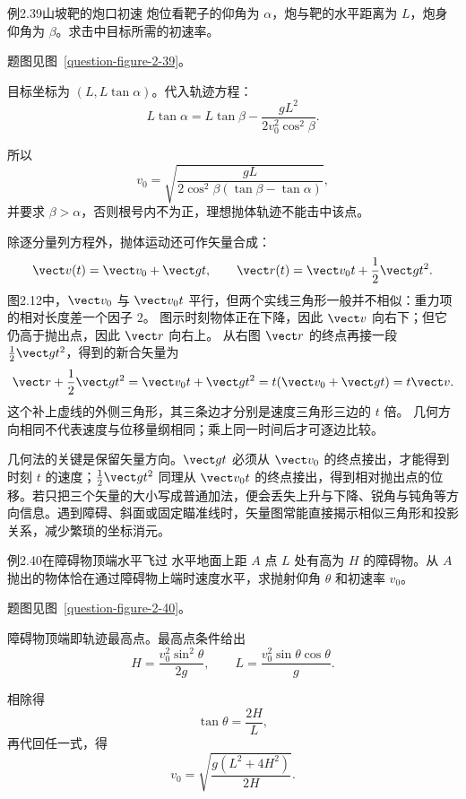 \begin{origexamplebox}{例2.39\quad 山坡靶的炮口初速}
炮位看靶子的仰角为 $\alpha$，炮与靶的水平距离为 $L$，炮身仰角为 $\beta$。求击中目标所需的初速率。
\par 题图见图~\ref{question-figure-2-39}。
\KQuestionBN
\end{origexamplebox}
\begin{xesolution}
目标坐标为 $(L,L\tan\alpha)$。代入轨迹方程：
\[
L\tan\alpha=L\tan\beta-
\frac{gL^2}{2v_0^2\cos^2\beta}.
\]
\HillsideTargetDiagram

所以
\[
 \boxed{v_0=\sqrt{\frac{gL}{2\cos^2\beta(\tan\beta-\tan\alpha)}}},
\]
并要求 $\beta>\alpha$，否则根号内不为正，理想抛体轨迹不能击中该点。
\end{xesolution}

\ProjectileVectorsDiagram

除逐分量列方程外，抛体运动还可作矢量合成：
\begin{equation}
 \vect v(t)=\vect v_0+\vect g t,
 \qquad
 \vect r(t)=\vect v_0t+\frac12\vect g t^2.
\end{equation}
图2.12中，$\vect v_0$ 与 $\vect v_0t$ 平行，但两个实线三角形一般并不相似：重力项的相对长度差一个因子 $2$。
图示时刻物体正在下降，因此 $\vect v$ 向右下；但它仍高于抛出点，因此 $\vect r$ 向右上。
从右图 $\vect r$ 的终点再接一段 $\frac12\vect g t^2$，得到的新合矢量为
\[
 \vect r+\frac12\vect g t^2
 =\vect v_0t+\vect g t^2=t(\vect v_0+\vect gt)=t\vect v.
\]
这个补上虚线的外侧三角形，其三条边才分别是速度三角形三边的 $t$ 倍。
几何方向相同不代表速度与位移量纲相同；乘上同一时间后才可逐边比较。

几何法的关键是保留矢量方向。$\vect g t$ 必须从 $\vect v_0$ 的终点接出，才能得到时刻 $t$ 的速度；$\frac12\vect g t^2$ 同理从 $\vect v_0t$ 的终点接出，得到相对抛出点的位移。若只把三个矢量的大小写成普通加法，便会丢失上升与下降、锐角与钝角等方向信息。遇到障碍、斜面或固定瞄准线时，矢量图常能直接揭示相似三角形和投影关系，减少繁琐的坐标消元。

\begin{origexamplebox}{例2.40\quad 在障碍物顶端水平飞过}
水平地面上距 $A$ 点 $L$ 处有高为 $H$ 的障碍物。从 $A$ 抛出的物体恰在通过障碍物上端时速度水平，求抛射仰角 $\theta$ 和初速率 $v_0$。
\par 题图见图~\ref{question-figure-2-40}。
\KQuestionBO
\end{origexamplebox}
\begin{xesolution}
障碍物顶端即轨迹最高点。最高点条件给出
\[
H=\frac{v_0^2\sin^2\theta}{2g},\qquad
L=\frac{v_0^2\sin\theta\cos\theta}{g}.
\]
\HorizontalAtObstacleDiagram

相除得
\[
 \boxed{\tan\theta=\frac{2H}{L}},
\]
再代回任一式，得
\[
 \boxed{v_0=\sqrt{\frac{g(L^2+4H^2)}{2H}}}.
\]
\end{xesolution}

